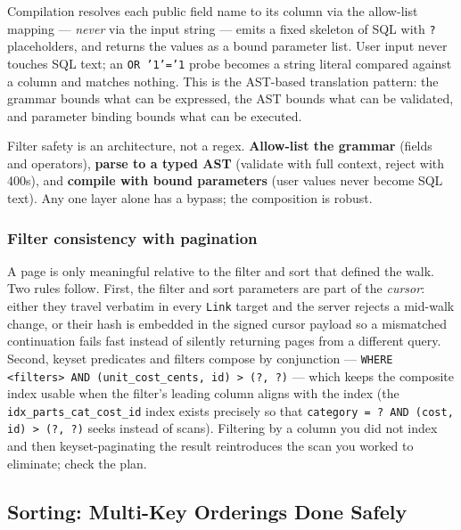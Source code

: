 Compilation resolves each public field name to its column via the allow-list
mapping --- \emph{never} via the input string --- emits a fixed skeleton of
SQL with \texttt{?} placeholders, and returns the values as a bound parameter
list. User input never touches SQL text; an \texttt{OR '1'='1} probe becomes
a string literal compared against a column and matches nothing. This is the
AST-based translation pattern: the grammar bounds what can be expressed, the
AST bounds what can be validated, and parameter binding bounds what can be
executed.

\begin{keyconceptbox}
Filter safety is an architecture, not a regex. \textbf{Allow-list the
grammar} (fields and operators), \textbf{parse to a typed AST} (validate
with full context, reject with 400s), and \textbf{compile with bound
parameters} (user values never become SQL text). Any one layer alone has a
bypass; the composition is robust.
\end{keyconceptbox}

\subsubsection{Filter consistency with pagination}
\label{subsec:ch8-filter-consistency}

A page is only meaningful relative to the filter and sort that defined the
walk. Two rules follow. First, the filter and sort parameters are part of
the \emph{cursor}: either they travel verbatim in every \texttt{Link} target
and the server rejects a mid-walk change, or their hash is embedded in the
signed cursor payload so a mismatched continuation fails fast instead of
silently returning pages from a different query. Second, keyset predicates
and filters compose by conjunction --- \texttt{WHERE <filters> AND
(unit\_cost\_cents, id) > (?, ?)} --- which keeps the composite index
usable when the filter's leading column aligns with the index (the
\texttt{idx\_parts\_cat\_cost\_id} index exists precisely so that
\texttt{category = ? AND (cost, id) > (?, ?)} seeks instead of scans).
Filtering by a column you did not index and then keyset-paginating the
result reintroduces the scan you worked to eliminate; check the plan.

\subsection{Sorting: Multi-Key Orderings Done Safely}
\label{subsec:ch8-sorting}

